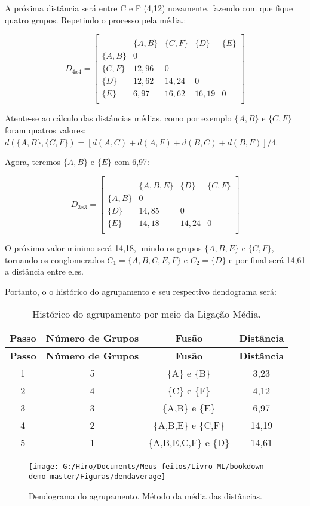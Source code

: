 \documentclass[
]{book}
\begin{document}
A próxima distância será entre C e F (4,12) novamente, fazendo com que fique quatro grupos. Repetindo o processo pela média.:

\[D_{4x4}=\begin{bmatrix}\\
 &\{A,B\}& \{C,F\}&\{D\}&\{E\} \\
 \{A,B\}&0&&\\
 \{C,F\} & 12,96&0&&\\
 \{D\}& 12,62& 14,24&0&\\
 \{E\}& 6,97& 16,62& 16,19&0\\
\end{bmatrix}\]

Atente-se ao cálculo das distâncias médias, como por exemplo \(\{A,B\}\) e \(\{C,F\}\) foram quatros valores: \(d(\{A,B\},\{C,F\})=[d(A,C)+d(A,F)+d(B,C)+d(B,F)]/4\).

Agora, teremos \(\{A,B\}\) e \(\{E\}\) com 6,97:

\[D_{3x3}=\begin{bmatrix}\\
 &\{A,B,E\}& \{D\}&\{C,F\} \\
 \{A,B\}&0&\\
 \{D\} & 14,85&0&\\
 \{E\}& 14,18& 14,24&0\\
\end{bmatrix}\]

O próximo valor mínimo será 14,18, unindo os grupos \(\{A,B,E\}\) e \(\{C,F\}\), tornando os conglomerados \(C_1=\{A,B,C,E,F\}\) e \(C_2=\{D\}\) e por final será 14,61 a distância entre eles.

Portanto, o o histórico do agrupamento e seu respectivo dendograma será:

\begin{longtable}[]{@{}cccc@{}}
\caption{\label{tab:ligmedia} Histórico do agrupamento por meio da Ligação Média.}\tabularnewline
\toprule
\textbf{Passo} & \textbf{Número de Grupos} & \textbf{Fusão} & \textbf{Distância}\tabularnewline
\midrule
\endfirsthead
\toprule
\textbf{Passo} & \textbf{Número de Grupos} & \textbf{Fusão} & \textbf{Distância}\tabularnewline
\midrule
\endhead
1 & 5 & \{A\} e \{B\} & 3,23\tabularnewline
2 & 4 & \{C\} e \{F\} & 4,12\tabularnewline
3 & 3 & \{A,B\} e \{E\} & 6,97\tabularnewline
4 & 2 & \{A,B,E\} e \{C,F\} & 14,19\tabularnewline
5 & 1 & \{A,B,E,C,F\} e \{D\} & 14,61\tabularnewline
\bottomrule
\end{longtable}

\begin{figure}

{\centering \texttt{[image: G:/Hiro/Documents/Meus feitos/Livro ML/bookdown-demo-master/Figuras/dendaverage]} 

}

\caption{Dendograma do agrupamento. Método da média das distâncias.}\label{fig:dendaverage}
\end{figure}
\end{document}
